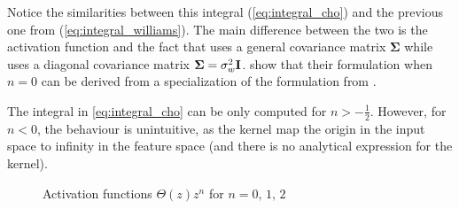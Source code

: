 Notice the similarities between this integral (\cref{eq:integral_cho}) and the
previous one from \citeauthor{williamsComputationInfiniteNeural1998}
(\cref{eq:integral_williams}). The main difference between the two is the
activation function and the fact that
\citeauthor{williamsComputationInfiniteNeural1998} uses a general covariance
matrix $\boldsymbol\Sigma$ while
\citeauthor{choLargemarginClassificationInfinite2010} uses a diagonal covariance
matrix $\boldsymbol\Sigma = \sigma_w^2 \textbf I$.
 show that their
formulation when $n=0$ can be derived from a specialization of the formulation
from \textcite{williamsComputationInfiniteNeural1998}.

The integral in \cref{eq:integral_cho} can be only computed for $n >
    -\frac{1}{2}$. However, for $n < 0$, the behaviour is unintuitive, as the kernel
map the origin in the input space to infinity in the feature space (and there is
no analytical expression for the kernel).

\begin{figure}[H]
    \caption{Activation functions $\Theta(z)z^n$ for $n = 0,\,1,\,2$}
    \label{fig:activation_functions}
\end{figure}

